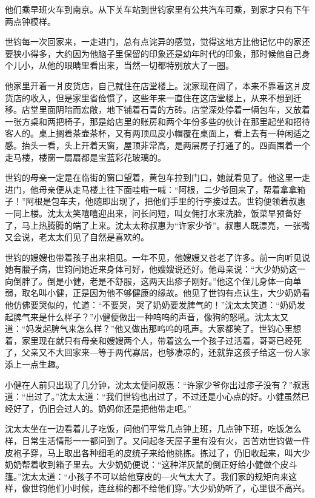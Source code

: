 \par 他们乘早班火车到南京。从下关车站到世钧家里有公共汽车可乘，到家才只有下午两点钟模样。
\par 世钧每一次回家来，一走进门，总有点诧异的感觉，觉得这地方比他记忆中的家还要狭小得多，大约因为他脑子里保留的印象还是幼年时代的印象，那时候他自己身个儿小，从他的眼睛里看出来，当然一切都特别放大了一圈。
\par 他家里开着一爿皮货店，自己就住在店堂楼上。沈家现在阔了，本来不靠着这爿皮货店的收入，但是家里省俭惯了，这些年来一直住在这店堂楼上，从来不想到迁移。店堂里面阴暗而宏敞，地下铺着石青的方砖。店堂深处停着一辆包车，又放着一张方桌和两把椅子，那是给店里的账房和两个年份多些的伙计在那里起坐和招待客人的。桌上搁着茶壶茶杯，又有两顶瓜皮小帽覆在桌面上，看上去有一种闲适之感。抬头一看，头上开着天窗，屋顶非常高，是两层房子打通了的。四面围着一个走马楼，楼窗一扇扇都是宝蓝彩花玻璃的。
\par 世钧的母亲一定是在临街的窗口望着，黄包车拉到门口，她就看见了。他这里一走进门，他母亲便从走马楼上往下面哇啦一喊：“阿根，二少爷回来了，帮着拿拿箱子！”阿根是包车夫，他随即出现了，把他们手里的行李接过去。世钧便领着叔惠一同上楼。沈太太笑嘻嘻迎出来，问长问短，叫女佣打水来洗脸，饭菜早预备好了，马上热腾腾的端了上来。沈太太称叔惠为“许家少爷”。叔惠人既漂亮，一张嘴又会说，老太太们见了自然是喜欢的。
\par 世钧的嫂嫂也带着孩子出来相见。一年不见，他嫂嫂又苍老了许多。前一向听见说她有腰子病，世钧问她近来身体可好，他嫂嫂说还好。他母亲说：“大少奶奶这一向倒胖了。倒是小健，老是不舒服，这两天出疹子刚好。”他这个侄儿身体一向单弱，取名叫小健，正是因为他不够健康的缘故。他见了世钧有点认生，大少奶奶看他仿佛要哭似的，忙道：“不要哭，哭了奶奶要发脾气的！”沈太太笑道：“奶奶发起脾气来是什么样子？”小健便做出一种呜呜的声音，像狗的怒吼。沈太太又道：“妈发起脾气来怎么样？”他又做出那呜呜的吼声。大家都笑了。世钧心里想着，家里现在就只有母亲和嫂嫂两个人，带着这么一个孩子过活着，哥哥已经死了，父亲又不大回家来—等于两代寡居，也够凄凉的，还就靠这孩子给这一份人家添上一点生趣。
\par 小健在人前只出现了几分钟，沈太太便问叔惠：“许家少爷你出过疹子没有？”叔惠道：“出过了。”沈太太道：“我们世钧也出过了，不过还是小心点的好。小健虽然已经好了，仍旧会过人的。奶妈你还是把他带走吧。”
\par 沈太太坐在一边看着儿子吃饭，问他们平常几点钟上班，几点钟下班，吃饭怎么样，日常生活情形一一都问到了。又问起冬天屋子里有没有火，苦苦劝世钧做一件皮袍子穿，马上取出各种细毛的皮统子来给他挑拣。拣过了，仍旧收起来，叫大少奶奶帮着收到箱子里去。大少奶奶便说：“这种洋灰鼠的倒正好给小健做个皮斗篷。”沈太太道：“小孩子不可以给他穿皮的—火气太大了。我们家的规矩向来这样，像世钧他们小时候，连丝棉的都不给他们穿。”大少奶奶听了，心里很不高兴。
